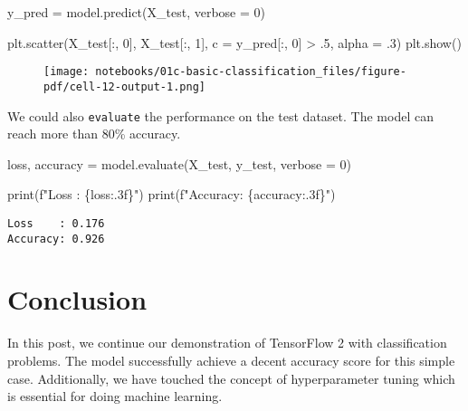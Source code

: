 \documentclass[
  letterpaper,
  DIV=11,
  numbers=noendperiod]{scrreprt}
\newenvironment{Shaded}{\begin{snugshade}}{\end{snugshade}}
\newcommand{\BuiltInTok}[1]{\textcolor[rgb]{0.00,0.23,0.31}{#1}}
\newcommand{\DecValTok}[1]{\textcolor[rgb]{0.68,0.00,0.00}{#1}}
\newcommand{\FloatTok}[1]{\textcolor[rgb]{0.68,0.00,0.00}{#1}}
\newcommand{\NormalTok}[1]{\textcolor[rgb]{0.00,0.23,0.31}{#1}}
\newcommand{\OperatorTok}[1]{\textcolor[rgb]{0.37,0.37,0.37}{#1}}
\newcommand{\SpecialCharTok}[1]{\textcolor[rgb]{0.37,0.37,0.37}{#1}}
\newcommand{\SpecialStringTok}[1]{\textcolor[rgb]{0.13,0.47,0.30}{#1}}
\begin{document}
\begin{Shaded}
\begin{Highlighting}[]
\NormalTok{y\_pred }\OperatorTok{=}\NormalTok{ model.predict(X\_test, verbose }\OperatorTok{=} \DecValTok{0}\NormalTok{)}

\NormalTok{plt.scatter(X\_test[:, }\DecValTok{0}\NormalTok{], X\_test[:, }\DecValTok{1}\NormalTok{], c }\OperatorTok{=}\NormalTok{ y\_pred[:, }\DecValTok{0}\NormalTok{] }\OperatorTok{\textgreater{}} \FloatTok{.5}\NormalTok{, alpha }\OperatorTok{=} \FloatTok{.3}\NormalTok{)}
\NormalTok{plt.show()}
\end{Highlighting}
\end{Shaded}

\begin{figure}[H]

{\centering \texttt{[image: notebooks/01c-basic-classification\_files/figure-pdf/cell-12-output-1.png]}

}

\end{figure}

We could also \texttt{evaluate} the performance on the test dataset. The
model can reach more than 80\% accuracy.

\begin{Shaded}
\begin{Highlighting}[]
\NormalTok{loss, accuracy }\OperatorTok{=}\NormalTok{ model.evaluate(X\_test, y\_test, verbose }\OperatorTok{=} \DecValTok{0}\NormalTok{)}

\BuiltInTok{print}\NormalTok{(}\SpecialStringTok{f"Loss    : }\SpecialCharTok{\{}\NormalTok{loss}\SpecialCharTok{:.3f\}}\SpecialStringTok{"}\NormalTok{)}
\BuiltInTok{print}\NormalTok{(}\SpecialStringTok{f"Accuracy: }\SpecialCharTok{\{}\NormalTok{accuracy}\SpecialCharTok{:.3f\}}\SpecialStringTok{"}\NormalTok{)}
\end{Highlighting}
\end{Shaded}

\begin{verbatim}
Loss    : 0.176
Accuracy: 0.926
\end{verbatim}

\hypertarget{conclusion-1}{%
\section{Conclusion}\label{conclusion-1}}

In this post, we continue our demonstration of TensorFlow 2 with
classification problems. The model successfully achieve a decent
accuracy score for this simple case. Additionally, we have touched the
concept of hyperparameter tuning which is essential for doing machine
learning.
\end{document}
